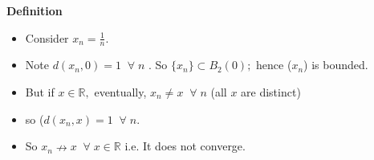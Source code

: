 \documentclass[12pt]{article}
\begin{document}
\begin{block}{\bf Definition}
\begin{itemize}
 \item Consider $x_n = \frac{1}{n}.$
 \item Note $d(x_n,0) = 1\;\; \forall\; n$ . So $\{{x_n}\} \subset B_2(0);$ hence ($x_n$) is bounded. 
 \item But if $x\in \mathbb{R}, $ eventually, $x_n \neq x\;\; \forall\; n$
 \hfill (all $x$ are distinct)
 \item so ($d(x_n, x) = 1 \;\;\forall\;n.$ 
 \item So $x_n \nrightarrow x\;\;\forall\;x\in\mathbb{R}$\hfill
 i.e. It does not converge.
 \end{itemize}
 
  


\end{block}
\end{document}
